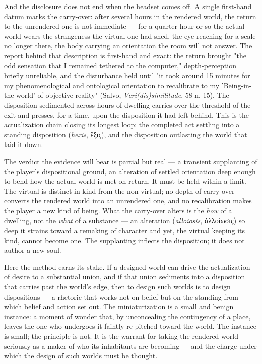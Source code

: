 \documentclass{article}
\newcommand{\gk}[1]{{\greekfont #1}}
\begin{document}
And the disclosure does not end when the headset comes off. A single first-hand datum marks the carry-over: after several hours in the rendered world, the return to the unrendered one is not immediate — for a quarter-hour or so the actual world wears the strangeness the virtual one had shed, the eye reaching for a scale no longer there, the body carrying an orientation the room will not answer. The report behind that description is first-hand and exact: the return brought "the odd sensation that I remained tethered to the computer," depth-perception briefly unreliable, and the disturbance held until "it took around 15 minutes for my phenomenological and ontological orientation to recalibrate to my 'Being-in-the-world' of objective reality" (Salvo, \textit{Veri(dis)similitude}, 58 n. 15). The disposition sedimented across hours of dwelling carries over the threshold of the exit and presses, for a time, upon the disposition it had left behind. This is the actualization chain closing its longest loop: the completed act settling into a standing disposition (\textit{hexis}, \gk{ἕξις}), and the disposition outlasting the world that laid it down.

The verdict the evidence will bear is partial but real — a transient supplanting of the player's dispositional ground, an alteration of settled orientation deep enough to bend how the actual world is met on return. It must be held within a limit. The virtual is distinct in kind from the non-virtual; no depth of carry-over converts the rendered world into an unrendered one, and no recalibration makes the player a new kind of being. What the carry-over alters is the \textit{how} of a dwelling, not the \textit{what} of a substance — an alteration (\textit{alloiōsis}, \gk{ἀλλοίωσις}) so deep it strains toward a remaking of character and yet, the virtual keeping its kind, cannot become one. The supplanting inflects the disposition; it does not author a new soul.

Here the method earns its stake. If a designed world can drive the actualization of desire to a substantial union, and if that union sediments into a disposition that carries past the world's edge, then to design such worlds is to design dispositions — a rhetoric that works not on belief but on the standing from which belief and action set out. The miniaturization is a small and benign instance: a moment of wonder that, by unconcealing the contingency of a place, leaves the one who undergoes it faintly re-pitched toward the world. The instance is small; the principle is not. It is the warrant for taking the rendered world seriously as a maker of who its inhabitants are becoming — and the charge under which the design of such worlds must be thought.
\end{document}
